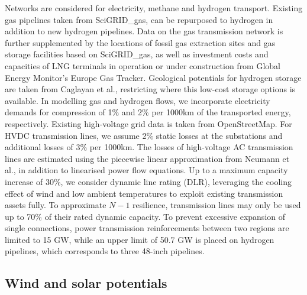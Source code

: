 Networks are considered for electricity, methane and hydrogen transport.
Existing gas pipelines taken from SciGRID\_gas,\cite{plutaSciGRIDGas2022a} can
be repurposed to hydrogen in addition to new hydrogen
pipelines.\cite{neumannPotentialRoleHydrogen2023} Data on the gas transmission
network is further supplemented by the locations of fossil gas extraction sites
and gas storage facilities based on SciGRID\_gas,\cite{plutaSciGRIDGas2022a} as
well as investment costs and capacities of LNG terminals in operation or under
construction from Global Energy Monitor's Europe Gas
Tracker.\cite{globalenergymonitorEuropeGasTracker2024} Geological potentials for
hydrogen storage are taken from Caglayan et
al.,\cite{caglayanTechnicalPotentialSalt2020} restricting where this low-cost
storage options is available. In modelling gas and hydrogen flows, we
incorporate electricity demands for compression of 1\% and 2\% per 1000km of the
transported energy, respectively.\cite{gasforclimateEuropeanHydrogen2021}
Existing high-voltage grid data is taken from
OpenStreetMap.\cite{xiongModellingHighVoltageGrid2024} For HVDC transmission
lines, we assume 2\% static losses at the substations and additional losses of
3\% per 1000km. The losses of high-voltage AC transmission lines are estimated
using the piecewise linear approximation from Neumann et
al.,\cite{neumannAssessmentsLinear2022} in addition to linearised power flow
equations.\cite{horschLinearOptimal2018} Up to a maximum capacity increase of
30\%, we consider dynamic line rating (DLR), leveraging the cooling effect of
wind and low ambient temperatures to exploit existing transmission assets
fully.\cite{glaumLeveragingExisting2023} To approximate $N-1$ resilience,
transmission lines may only be used up to 70\% of their rated dynamic
capacity.\cite{shokrigazafroudiTopologybasedApproximations12022} To prevent
excessive expansion of single connections, power transmission reinforcements
between two regions are limited to 15 GW, while an upper limit of 50.7 GW is
placed on hydrogen pipelines, which corresponds to three 48-inch
pipelines.\cite{gasforclimateEuropeanHydrogen2021}

\subsection*{Wind and solar potentials}

